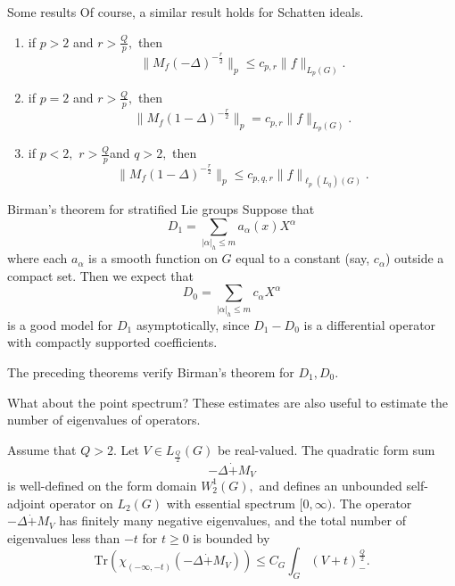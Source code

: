 \documentclass{beamer}
\numberwithin{equation}{section}
\theoremstyle{plain}
\theoremstyle{plain}
\theoremstyle{definition}
\theoremstyle{plain}
\theoremstyle{plain}
\theoremstyle{definition}
\newcommand{\Tr}{\mathrm{Tr}}
\begin{document}
\begin{frame}{Some results}
Of course, a similar result holds for Schatten ideals.

\begin{theorem}\label{cwikel schatten_theorem}
\begin{enumerate}[{\rm (i)}]
\item if $p>2$ and $r>\frac{Q}{p},$ then
$$\|M_f(-\Delta)^{-\frac{r}{2}}\|_p\leq c_{p,r}\|f\|_{L_p(G)}.$$
\item if $p=2$ and $r>\frac{Q}{p},$ then
$$\|M_f(1-\Delta)^{-\frac{r}{2}}\|_p=c_{p,r}\|f\|_{L_p(G)}.$$
\item if $p<2,$ $r>\frac{Q}{p}$and $q>2,$ then
$$\|M_f(1-\Delta)^{-\frac{r}{2}}\|_p\leq c_{p,q,r}\|f\|_{\ell_p(L_q)(G)}.$$
\end{enumerate}
\end{theorem}
\end{frame}


\begin{frame}{Birman's theorem for stratified Lie groups}
  Suppose that
  \[
      D_1 = \sum_{|\alpha|_h\leq m} a_{\alpha}(x)X^{\alpha}
  \]
  where each $a_{\alpha}$ is a smooth function on $G$ equal to a constant (say, $c_{\alpha}$) outside a compact set.
  Then we expect that
  \[
      D_0 = \sum_{|\alpha|_h\leq m} c_{\alpha}X^{\alpha}
  \]
  is a good model for $D_1$ asymptotically, since $D_1-D_0$ is a differential operator with compactly supported coefficients.

  The preceding theorems verify Birman's theorem for $D_1,D_0.$
\end{frame}

\begin{frame}{What about the point spectrum?}
  These estimates are also useful to estimate the number of eigenvalues of operators.
\begin{theorem}\label{CLR_theorem}
    Assume that $Q>2.$ Let $V \in L_{\frac{Q}{2}}(G)$ be real-valued. The quadratic form sum
    \[
        -\Delta\dot{+}M_V
    \]
    is well-defined on the form domain $W^1_2(G),$ and defines an unbounded self-adjoint operator on $L_2(G)$ with essential spectrum $[0,\infty).$ The operator $-\Delta\dot{+}M_V$ has finitely many negative eigenvalues, and the total number of eigenvalues less than $-t$ for $t\geq 0$ is bounded by
    \[
        \Tr(\chi_{(-\infty,-t)}(-\Delta\dot{+}M_V)) \leq C_{G}\int_{G} (V+t)_-^{\frac{Q}{2}}.
    \]
\end{theorem}
\end{frame}
\end{document}
